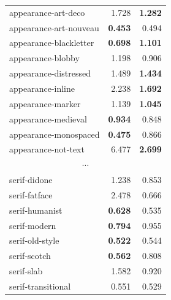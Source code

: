 \begin{longtable}{|l|r|r|}
appearance-art-deco       & 1.728                   & \textbf{1.282}      \\
appearance-art-nouveau    & \textbf{0.453}          & 0.494               \\
appearance-blackletter    & \textbf{0.698}          & \textbf{1.101}      \\
appearance-blobby         & 1.198                   & 0.906               \\
appearance-distressed     & 1.489                   & \textbf{1.434}      \\
appearance-inline         & 2.238                   & \textbf{1.692}      \\
appearance-marker         & 1.139                   & \textbf{1.045}      \\
appearance-medieval       & \textbf{0.934}          & 0.848               \\
appearance-monospaced     & \textbf{0.475}          & 0.866               \\
appearance-not-text       & 6.477                   & \textbf{2.699}      \\
\hline
\multicolumn{3}{|c|}{$\cdots$} \\
\hline
serif-didone              & 1.238                   & 0.853               \\
serif-fatface             & 2.478                   & 0.666               \\
serif-humanist            & \textbf{0.628}          & 0.535               \\
serif-modern              & \textbf{0.794}          & 0.955               \\
serif-old-style           & \textbf{0.522}          & 0.544               \\
serif-scotch              & \textbf{0.562}          & 0.808               \\
serif-slab                & 1.582                   & 0.920               \\
serif-transitional        & 0.551                   & 0.529         \\           

\end{longtable}

